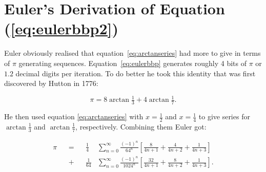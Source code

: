 \documentclass[11pt]{article}
\begin{document}
\section{Euler's Derivation of Equation (\ref{eq:eulerbbp2})}

Euler obviously realised that equation~\eqref{eq:arctanseries} had more to give in terms of $\pi$ generating sequences. Equation~\eqref{eq:eulerbbp} generates roughly 4 bits of $\pi$ or $1.2$ decimal digits per iteration. To do better he took this identity that was first discovered by Hutton \cite{Arndt2001} in 1776:

\begin{equation}
\pi = 8 \arctan{\tfrac{1}{3}} + 4 \arctan{\tfrac{1}{7}}.
\end{equation}

He then used equation \eqref{eq:arctanseries} with $x=\frac{1}{2}$ and $x=\frac{1}{4}$ to give series for $\arctan{\frac{1}{3}}$ and $\arctan{\frac{1}{7}}$, respectively. Combining them Euler got:

\iffalse                        %

\begin{equation}
\begin{split}
  \pi
  &= 8 \sum_{n = 0}^\infty \frac{(-1)^n}{4^{n+1}} \left[
    \frac{2(\frac{1}{2})^{4n+1}}{4n+1}
    + \frac{2(\frac{1}{2})^{4n+2}}{4n+2}
    + \frac{(\frac{1}{2})^{4n+3}}{4n+3}
  \right] \\
  &+ 4 \sum_{n = 0}^\infty \frac{(-1)^n}{4^{n+1}} \left[
    \frac{2(\frac{1}{4})^{4n+1}}{4n+1}
    + \frac{2(\frac{1}{4})^{4n+2}}{4n+2}
    + \frac{(\frac{1}{4})^{4n+3}}{4n+3}
  \right]
\end{split}
\end{equation}

Which with a bit of simplification becomes

\fi                             %

\begin{equation}
\begin{aligned}
  \pi
  &&=&& \frac{1}{4} &\sum_{n = 0}^\infty \frac{(-1)^n}{64^n} \left[
    \frac{8}{4n+1}
    + \frac{4}{4n+2}
    + \frac{1}{4n+3}
  \right] \\
  &&+&& \frac{1}{64} &\sum_{n = 0}^\infty \frac{(-1)^n}{1024^n} \left[
    \frac{32}{4n+1}
    + \frac{8}{4n+2}
    + \frac{1}{4n+3}
  \right].
\end{aligned}
\end{equation}
\end{document}
